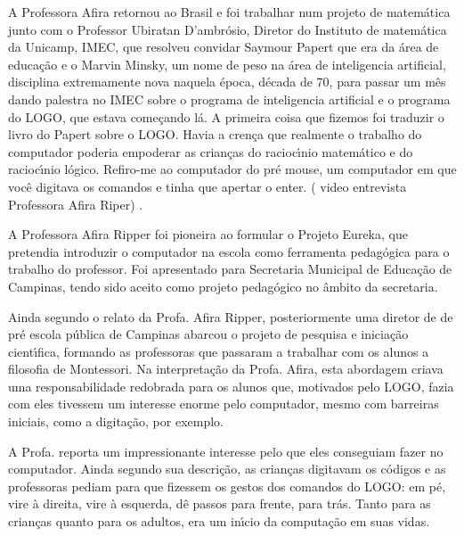 \documentclass[
12pt,		%
openright,	%
twoside,  %
a4paper,			%
chapter=TITLE,		%
english,			%
french,				%
spanish,			%
brazil				%
]{USPSC-classe/USPSC_RedarTex}
\begin{document}
A Professora Afira  retornou ao  Brasil e foi trabalhar num  projeto de matem\'atica junto com o Professor  Ubiratan D’ambr\'osio, Diretor do  Instituto de matem\'atica da Unicamp, IMEC, que resolveu convidar Saymour Papert que era da \'area de educa\c{c}\~ao e o Marvin Minsky,  um nome de peso na \'area de inteligencia artificial, disciplina extremamente nova naquela \'epoca, d\'ecada de 70, para passar um m\^es dando palestra  no IMEC sobre o programa de inteligencia artificial e o programa do LOGO, que estava come\c{c}ando l\'a.  A primeira coisa que fizemos foi traduzir o livro do Papert sobre o LOGO.  Havia a cren\c{c}a que realmente o trabalho do computador  poderia empoderar as crian\c{c}as do racioc\'{\i}nio matem\'atico e do racioc\'{\i}nio l\'ogico. Refiro-me ao computador do pr\'e mouse, um computador  em que voc\^e digitava os comandos e tinha que apertar o enter. ( video entrevista Professora Afira Riper) .\textquotedbl 










A Professora Afira Ripper foi pioneira ao formular o Projeto Eureka, que pretendia introduzir o computador na escola como ferramenta pedag\'ogica para o trabalho do professor. Foi apresentado para  Secretaria Municipal de Educa\c{c}\~ao de Campinas, tendo sido aceito como projeto pedag\'ogico no \^ambito da secretaria.










Ainda segundo o relato da Profa. Afira Ripper, posteriormente uma diretor de de pr\'e escola p\'ublica de Campinas abarcou  o projeto de pesquisa e inicia\c{c}\~ao cient\'{\i}fica, formando as professoras que passaram a trabalhar com os alunos  a filosofia de Montessori. Na interpreta\c{c}\~ao da Profa. Afira, esta abordagem criava uma responsabilidade redobrada para os alunos que, motivados pelo LOGO, fazia com eles tivessem um interesse enorme pelo computador, mesmo com barreiras iniciais, como a digita\c{c}\~ao, por exemplo.










A Profa. reporta um impressionante interesse pelo que eles conseguiam fazer no computador. Ainda segundo sua descri\c{c}\~ao, as crian\c{c}as digitavam  os c\'odigos e as professoras pediam para que fizessem os gestos dos comandos do LOGO: \textquotedbl em p\'e\textquotedbl , \textquotedbl vire \`a direita\textquotedbl , \textquotedbl vire \`a esquerda\textquotedbl , \textquotedbl d\^e passos para frente\textquotedbl , \textquotedbl para tr\'as\textquotedbl . Tanto para as crian\c{c}as quanto para os adultos, era um in\'{\i}cio da computa\c{c}\~ao em suas vidas.
\end{document}
